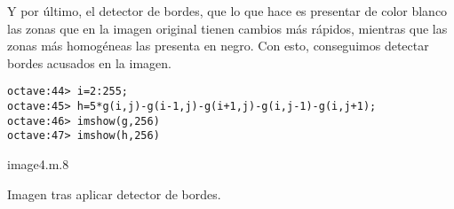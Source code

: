 
Y por último, el  detector de bordes, que lo que  hace es presentar de
color blanco  las zonas que en  la imagen original tienen  cambios más
rápidos, mientras que las zonas  más homogéneas las presenta en negro.
Con esto, conseguimos detectar bordes acusados en la imagen.

\begin{verbatim}
octave:44> i=2:255;
octave:45> h=5*g(i,j)-g(i-1,j)-g(i+1,j)-g(i,j-1)-g(i,j+1);
octave:46> imshow(g,256)
octave:47> imshow(h,256)
\end{verbatim}

\begin{figura}{image4.m}{.8}
\caption{Imagen tras aplicar detector de bordes.}
\end{figura}
